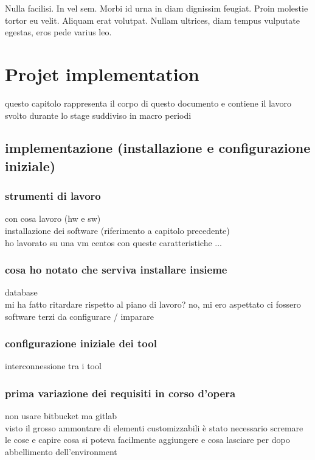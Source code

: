 \begin{savequote}[75mm]
Nulla facilisi. In vel sem. Morbi id urna in diam dignissim feugiat. Proin molestie tortor eu velit. Aliquam erat volutpat. Nullam ultrices, diam tempus vulputate egestas, eros pede varius leo.
\end{savequote}

\chapter{Projet implementation}

questo capitolo rappresenta il corpo di questo documento e contiene il lavoro svolto durante lo stage suddiviso in macro periodi

\section{implementazione (installazione e configurazione iniziale)}

	\subsection{strumenti di lavoro}
		con cosa lavoro (hw e sw)\\
		installazione dei software (riferimento a capitolo precedente)\\
		ho lavorato su una vm centos con queste caratteristiche ...
		
	\subsection{cosa ho notato che serviva installare insieme}
		database\\
		mi ha fatto ritardare rispetto al piano di lavoro? no, mi ero aspettato ci fossero software terzi da configurare / imparare
	
	\subsection{configurazione iniziale dei tool}
		interconnessione tra i tool
	
	\subsection{prima variazione dei requisiti in corso d'opera}
		non usare bitbucket ma gitlab\\
		visto il grosso ammontare di elementi customizzabili è stato necessario scremare le cose e capire cosa si poteva facilmente aggiungere e cosa lasciare per dopo\\
		abbellimento dell'environment
	
